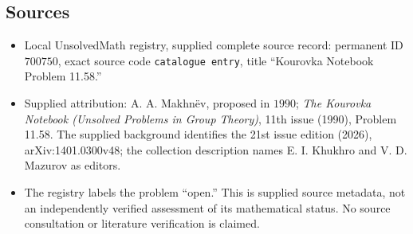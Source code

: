 \documentclass[11pt]{article}
\begin{document}
\subsection{Sources}
\begin{itemize}
\item Local UnsolvedMath registry, supplied complete source record: permanent ID \(700750\), exact source code \texttt{catalogue entry}, title ``Kourovka Notebook Problem 11.58.''
\item Supplied attribution: A. A. Makhn\"ev, proposed in \(1990\); \emph{The Kourovka Notebook (Unsolved Problems in Group Theory)}, 11th issue (1990), Problem 11.58. The supplied background identifies the 21st issue edition (2026), arXiv:1401.0300v48; the collection description names E. I. Khukhro and V. D. Mazurov as editors.
\item The registry labels the problem ``open.'' This is supplied source metadata, not an independently verified assessment of its mathematical status. No source consultation or literature verification is claimed.
\end{itemize}
\end{document}

